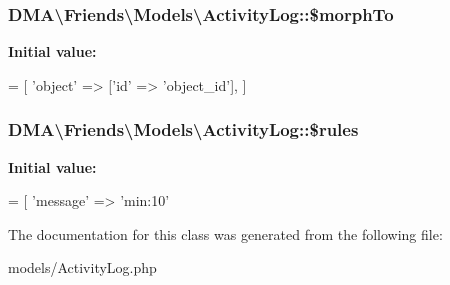 \subsubsection[{\$morph\+To}]{\setlength{\rightskip}{0pt plus 5cm}D\+M\+A\textbackslash{}\+Friends\textbackslash{}\+Models\textbackslash{}\+Activity\+Log\+::\$morph\+To}\label{classDMA_1_1Friends_1_1Models_1_1ActivityLog_afaa82849e3e93bf41ac948658ac652ff}
{\bfseries Initial value\+:}
\begin{DoxyCode}
= [
        \textcolor{stringliteral}{'object'} => [\textcolor{stringliteral}{'id'} => \textcolor{stringliteral}{'object\_id'}],
    ]
\end{DoxyCode}
\hypertarget{classDMA_1_1Friends_1_1Models_1_1ActivityLog_a0b8a60f69fd1fef78f71d538ca6f12e0}{}
\subsubsection[{\$rules}]{\setlength{\rightskip}{0pt plus 5cm}D\+M\+A\textbackslash{}\+Friends\textbackslash{}\+Models\textbackslash{}\+Activity\+Log\+::\$rules\hspace{0.3cm}{\ttfamily [protected]}}\label{classDMA_1_1Friends_1_1Models_1_1ActivityLog_a0b8a60f69fd1fef78f71d538ca6f12e0}
{\bfseries Initial value\+:}
\begin{DoxyCode}
= [
        \textcolor{stringliteral}{'message'}       => \textcolor{stringliteral}{'min:10'}
\end{DoxyCode}


The documentation for this class was generated from the following file\+:\begin{DoxyCompactItemize}
\item 
models/Activity\+Log.\+php\end{DoxyCompactItemize}
